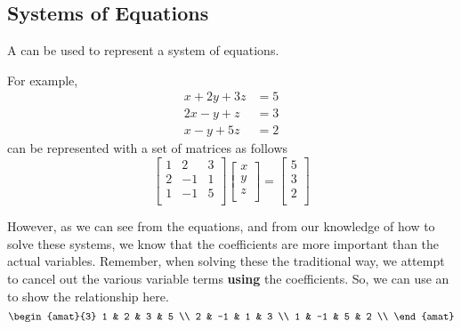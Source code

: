 \subsection{Systems of Equations}\label{subsec:Systems_Equations}
A  can be used to represent a system of equations.

For example,
\begin{align*}
  x + 2y + 3z &= 5 \\
  2x - y + z &= 3 \\
  x - y + 5z &= 2
\end{align*}
can be represented with a set of matrices as follows
\begin{equation*}
  \begin{bmatrix}
    1 & 2 & 3 \\
    2 & -1 & 1 \\
    1 & -1 & 5 \\
  \end{bmatrix}
  \begin{bmatrix}
    x \\
    y \\
    z \\
  \end{bmatrix}
  =
  \begin{bmatrix}
    5 \\
    3 \\
    2 \\
  \end{bmatrix}
\end{equation*}

However, as we can see from the equations, and from our knowledge of how to solve these systems, we know that the coefficients are more important than the actual variables.
Remember, when solving these the traditional way, we attempt to cancel out the various variable terms \textbf{using} the coefficients.
So, we can use an  to show the relationship here.
\begin{equation*}
  \begin{amat}{3}
    1 & 2 & 3 & 5 \\
    2 & -1 & 1 & 3 \\
    1 & -1 & 5 & 2 \\
  \end{amat}
\end{equation*}


